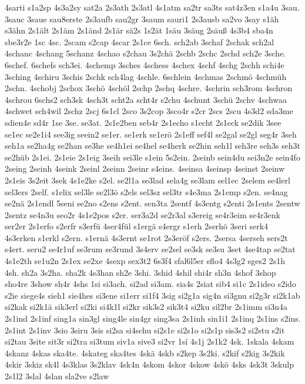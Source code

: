 {4sarti
s1a2sp
4s3a2sy
sat2a
2s3ath
2s3atl
4s1atm
sa2tr
sa3ts
sat4z3en
s1a4u
3sau.
3sauc
3saue
sau8erste
2s3aufb
sau2gr
3saum
sauri1
2s3ausb
sa2vo
3say
s1äh
s3ähn
2s1ält
2s1äm
2s1änd
2s1är
sä2s
1s2ät
1säu
3säug
2säuß
4s3b4
sba4n
sbe3r2e
1sc
4sc.
2scam
s2cap
4scar
2s1ce
6sch.
sch2ab
3schaf
2schak
sch2al
4schanc
4schang
5schanz
4schao
s2chau
3s2chä
2schb
2schc
2schd
sch2e
3sche.
6schef.
6schefs
sch3ei.
4schemp
3sches
4schess
4schex
4schf
4schg
2schh
schi4e
3sching
4schiru
3schis
2schk
sch4lag
4schle.
6schlein
4schmas
2schmö
4schmüh
2schn.
4schobj
2schox
3schö
4schöl
2schp
2schq
4schre.
4schrin
sch3rom
4schron
4schrou
6schs2
sch3sk
4sch3t
scht2a
scht4r
s2chu
4schunt
3schü
2schv
4schwaa
4schwet
sch4wil
2schz
2scj
6s1cl
2sco
3s2cop
3sco4r
s2cr
2scs
2scu
4s3d2
sda3me
sdien4e
sd4r
1se
3se.
se3at.
2s1e2ben
seb4r
2s1echo
s1echt
2s1eck
se2dik
3see
se1ec
se2e1i4
see3ig
seein2
se1er.
se1erk
se1erö
2s1eff
sef4l
se2gal
se2gl
seg4r
3seh
seh1a
se2ha4g
se2han
se3he
se4h1ei
se4hel
se4herk
se2hin
seh1l
seh3re
seh3s
seh3t
se2hüb
2s1ei.
2s1eie
2s1eig
3seih
sei3le
s1ein
5s2ein.
2seinb
sein4du
sei3n2e
sein4fo
2seing
2seinh
4seink
2seinl
2seinn
2seinr
s4eins.
4seinsa
4seinsp
4seinst
2seinw
2s1eis
3s2eit
3sek
4s1e2ke
s2el.
se2l1a
se3lad
sela4g
se3lam
sel1ec
2selem
se4lerl
sel3ers
2self.
s1elix
sel3le
se2l3ö
s2els
sel3sz
sel3tr
s4e3ma
2s1emp
s2en.
se4nag
se2nä
2s1endl
5seni
se2no
s2ens
s2ent.
sen3ta
2sentf
4s3entg
s2enti
2s1ents
2sentw
2sentz
se4n3u
seo2r
4s1e2pos
s2er.
ser3a2d
se2r3al
s3ereig
se4r3eim
se4r3enk
ser2er
2s1erfo
s2erfr
s3erfü
4ser4fül
s1ergä
s4ergr
s1erh
2serhö
3seri
serk4
4s3erken
s1erkl
s2ern.
s1ernä
4s3ernt
se1rot
2s3eröf
s2ers.
2sersa
4serseh
sers2t
s4ert.
seru2
se4r1uf
se3rum
se3rund
3s4erv
se2sel
se3sk
se3su
3set
4se4tap
se2tat
4s1e2th
se1u2n
2s1ex
se2xe
4sexp
sex3t2
6s3f4
sfal6l5er
sflo4
4s3g2
sges2
2s1h
4sh.
sh2a
3s2ha.
sha2k
4s3han
sh2e
3shi.
3shid
4shil
shi4r
sh3n
4shof
3shop
sho4re
3show
sh4r
4shs
1si
si3ach.
si2ad
si3am.
sia4s
2siat
sib4
si1c
2s1ideo
s2ido
s2ie
siege4s
sieh1
sie4hes
si3ene
si1err
si1f4
3sig
si2g1a
sig4n
si3gnu
si2g3r
si2k1ab
si2kak
si2k1ä
sik3erl
si2ki
si4k1l
si2kr
sik3s2
sik3t4
si2ku
sil2br
2s1imm
si3n4a
2s1ind
2s1inf
sing1a
sin3gl
sing4le
sin4gr
sing3sa
2s1inh
sin1i1
2s1inq
2s1ins
s2ins.
2s1int
2s1inv
3sio
3siru
3sis
si2sa
si4schu
si2s1e
si2s1o
si2s1p
sis3s2
si2stu
s2it
si2tau
3site
sit3r
si2tra
si3tum
siv1a
sive3
si2vr
1sí
4s1j
2s1k2
4sk.
1skala
4skam
4skanz
4skas
ska4te.
4skateg
ska4tes
4skä
4skb
s2kep
3s2ki.
s2kif
s2kig
3s2kik
4skir
3skiz
sk4l
4s3klas
3s2klav
4sk4n
4skom
4skor
4skow
4skö
4sks
4sk3t
3skulp
2s1l2
3slal
4slan
sla2ve
s2law
}
